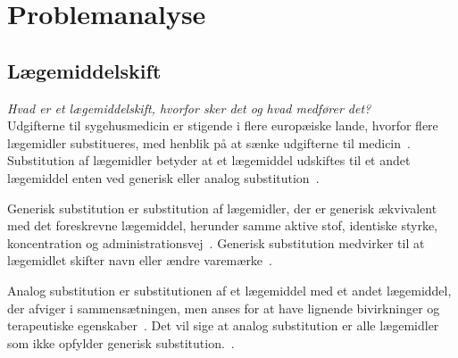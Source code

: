 \chapter{Problemanalyse}

\section{Lægemiddelskift}
\textit{Hvad er et lægemiddelskift, hvorfor sker det og hvad medfører det?} \\
Udgifterne til sygehusmedicin er stigende i flere europæiske lande, hvorfor flere lægemidler substitueres, med henblik på at sænke udgifterne til medicin~\citep{Ess2003,Johnston2011}. Substitution af lægemidler betyder at et lægemiddel udskiftes til et andet lægemiddel enten ved generisk eller analog substitution~\citep{DanskSelskabforPatientsikkerhed2009, Kairi2017}. 

Generisk substitution er substitution af lægemidler, der er generisk ækvivalent med det foreskrevne lægemiddel, herunder samme aktive stof, identiske styrke, koncentration og administrationsvej~\citep{DanskSelskabforPatientsikkerhed2009, Kairi2017}. Generisk substitution medvirker til at lægemidlet skifter navn eller ændre varemærke~\citep{Kairi2017}. %

Analog substitution er substitutionen af et lægemiddel med et andet lægemiddel, der afviger i sammensætningen, men anses for at have lignende bivirkninger og terapeutiske egenskaber~\citep{DanskSelskabforPatientsikkerhed2009, Kairi2017}. Det vil sige at analog substitution er alle lægemidler som ikke opfylder generisk substitution.~\citep{Kairi2017}. %


